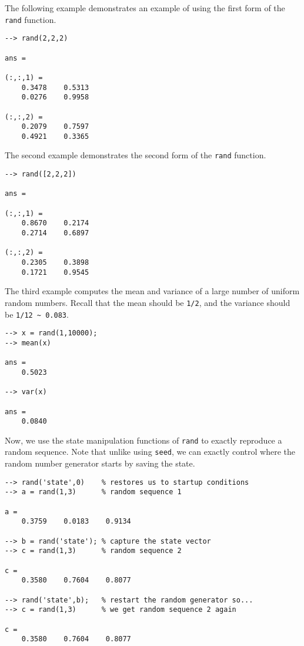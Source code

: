 The following example demonstrates an example of using the first form of the \verb|rand| function.
\begin{verbatim}
--> rand(2,2,2)

ans = 

(:,:,1) = 
    0.3478    0.5313 
    0.0276    0.9958 

(:,:,2) = 
    0.2079    0.7597 
    0.4921    0.3365 
\end{verbatim}
The second example demonstrates the second form of the \verb|rand| function.
\begin{verbatim}
--> rand([2,2,2])

ans = 

(:,:,1) = 
    0.8670    0.2174 
    0.2714    0.6897 

(:,:,2) = 
    0.2305    0.3898 
    0.1721    0.9545 
\end{verbatim}
The third example computes the mean and variance of a large number of uniform random numbers.  Recall that the mean should be \verb|1/2|, and the variance should be \verb|1/12 ~ 0.083|.
\begin{verbatim}
--> x = rand(1,10000);
--> mean(x)

ans = 
    0.5023 

--> var(x)

ans = 
    0.0840 
\end{verbatim}
Now, we use the state manipulation functions of \verb|rand| to exactly reproduce 
a random sequence.  Note that unlike using \verb|seed|, we can exactly control where
the random number generator starts by saving the state.
\begin{verbatim}
--> rand('state',0)    % restores us to startup conditions
--> a = rand(1,3)      % random sequence 1

a = 
    0.3759    0.0183    0.9134 

--> b = rand('state'); % capture the state vector
--> c = rand(1,3)      % random sequence 2  

c = 
    0.3580    0.7604    0.8077 

--> rand('state',b);   % restart the random generator so...
--> c = rand(1,3)      % we get random sequence 2 again

c = 
    0.3580    0.7604    0.8077 
\end{verbatim}
